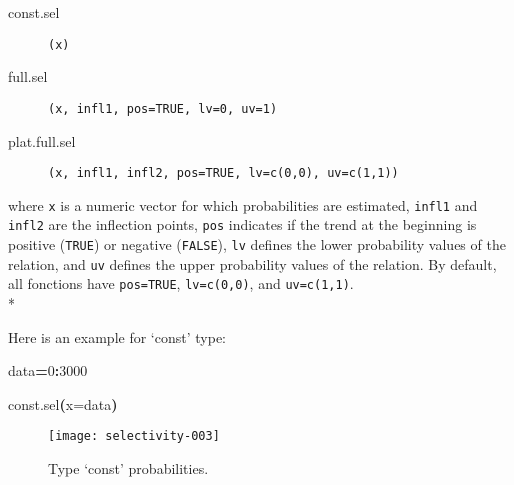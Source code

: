 \documentclass[letterpaper, 12pt]{article}
\newenvironment{Hinput}%
{}%
{}%
\newenvironment{Hchunk}%
{\vspace{0.5em}\par\begin{flushleft}}%
{\end{flushleft}}%
\newcommand{\hlnumber}[1]{\textcolor[rgb]{0.0823529411764706,0.0784313725490196,0.709803921568627}{#1}}%
\newcommand{\hlfunctioncall}[1]{\textcolor[rgb]{1,0,0}{#1}}%
\newcommand{\hlkeyword}[1]{\textcolor[rgb]{0,0,0}{\textbf{#1}}}%
\newcommand{\hlargument}[1]{\textcolor[rgb]{0.694117647058824,0.247058823529412,0.0196078431372549}{#1}}%
\newcommand{\hlassignement}[1]{\textcolor[rgb]{0.215686274509804,0.215686274509804,0.384313725490196}{\textbf{#1}}}%
\newcommand{\hlsymbol}[1]{\textcolor[rgb]{0,0,0}{#1}}%
\newcommand{\hlprompt}[1]{\textcolor[rgb]{0,0,0}{#1}}%
\begin{document}
\begin{description}
\item[const.sel]\verb#(x)#
\item[full.sel]\verb#(x, infl1, pos=TRUE, lv=0, uv=1)#
\item[plat.full.sel]\verb#(x, infl1, infl2, pos=TRUE, lv=c(0,0), uv=c(1,1))#
\end{description}
where \verb#x# is a numeric vector for which probabilities are estimated, \verb#infl1# and \verb#infl2# are the inflection points, 
\verb#pos# indicates if the trend at the beginning is positive  (\verb#TRUE#) or negative (\verb#FALSE#), \verb#lv# defines the 
lower probability values of the relation, and \verb#uv# defines the upper probability values of the relation. By default, 
all fonctions have \verb#pos=TRUE#, \verb#lv=c(0,0)#, and \verb#uv=c(1,1)#.\\*

Here is an example for `const' type:


\begin{Hchunk}
\begin{normalsize}
\begin{Hinput}
\ttfamily\noindent
\hlprompt{\usebox{\hlnormalsizeboxgreaterthan}{\ }}\hlsymbol{data}\hlassignement{=}\hlnumber{0}\hlkeyword{:}\hlnumber{3000}\mbox{}
\normalfont
\end{Hinput}


\begin{Hinput}
\ttfamily\noindent
\hlprompt{\usebox{\hlnormalsizeboxgreaterthan}{\ }}\hlfunctioncall{const.sel}\hlkeyword{(}\hlargument{x}\hlargument{=}\hlsymbol{data}\hlkeyword{)}\mbox{}
\normalfont
\end{Hinput}


\end{normalsize}
\end{Hchunk}


\begin{figure}[h]
\vspace{-20pt}
\begin{center}
\texttt{[image: selectivity-003]}
\end{center}
  \vspace{-30pt}
  \caption{Type `const' probabilities.}
  \vspace{-10pt}
\label{fig1}
\end{figure}
\vspace*{\fill}

\end{document}
